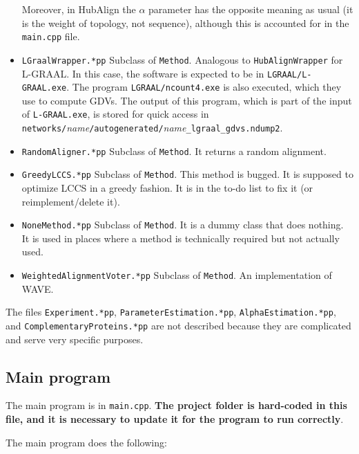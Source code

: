 \documentclass[]{article}
\begin{document}
\begin{itemize}
Moreover, in HubAlign the $\alpha$ parameter has the opposite meaning as usual (it is the weight of topology, not sequence), although this is accounted for in the \texttt{main.cpp} file.

\item \texttt{LGraalWrapper.*pp} Subclass of \texttt{Method}. Analogous to \texttt{HubAlignWrapper} for L-GRAAL. In this case, the software is expected to be in \texttt{LGRAAL/L-GRAAL.exe}. The program \texttt{LGRAAL/ncount4.exe} is also executed, which they use to compute GDVs. The output of this program, which is part of the input of \texttt{L-GRAAL.exe}, is stored for quick access in\\ \texttt{networks/}\textit{name}\texttt{/autogenerated/}\textit{name}\texttt{\_lgraal\_gdvs.ndump2}.

\item \texttt{RandomAligner.*pp} Subclass of \texttt{Method}. It returns a random alignment.

\item \texttt{GreedyLCCS.*pp} Subclass of \texttt{Method}. This method is bugged. It is supposed to optimize LCCS in a greedy fashion. It is in the to-do list to fix it (or reimplement/delete it).

\item \texttt{NoneMethod.*pp} Subclass of \texttt{Method}. It is a dummy class that does nothing. It is used in places where a method is technically required but not actually used.

\item \texttt{WeightedAlignmentVoter.*pp} Subclass of \texttt{Method}. An implementation of WAVE.

\end{itemize}
The files \texttt{Experiment.*pp}, \texttt{ParameterEstimation.*pp}, \texttt{AlphaEstimation.*pp}, and \texttt{ComplementaryProteins.*pp} are not described because they are complicated and serve very specific purposes.

\subsection{Main program}

The main program is in \texttt{main.cpp}. \textbf{The project folder is hard-coded in this file, and it is necessary to update it for the program to run correctly}.

The main program does the following:
\end{document}
